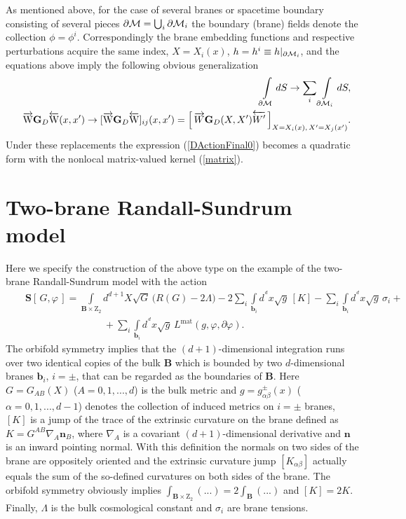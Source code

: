 \documentclass[a4paper,12pt]{article}
\newcommand{\ZA}{{A}}   %
\newcommand{\ZB}{{B}}   %
\newcommand{\ddim}{{d}}
\newcommand{\DDim}{{(d+\!1)}}
\newcommand{\M}{{\cal M}}
\newcommand{\dM}{{\partial \cal M}}
\newcommand{\dx}{{d^{^{\,\ddim}} \!x}}
\newcommand{\un}{\mathbf n} %
\newcommand{\Bnabla}{\nabla}  %
\newcommand{\GrD}{ \mathbf{G}_{D}}  %
\newcommand{\NGrDN}{\overrightarrow{\mathrm{W}}\mathbf{G}_{D}\overleftarrow{\mathrm{W}}} %
\newcommand{\RnGrDnR}{{\NGrDN}} %
\newcommand{\tens}{{\sigma}}
\newcommand{\dS}{dS}
\begin{document}
As mentioned above, for the case of several branes or spacetime
boundary consisting of several pieces $\dM=\bigcup_i\dM_i$ the
boundary (brane) fields denote the collection $\phi=\phi^i$.
Correspondingly the brane embedding functions and respective
perturbations acquire the same index, $X=X_i(x)$, $h=h^i\equiv
h|_{\dM_i}$, and the equations above imply the following obvious
generalization
    \begin{eqnarray}
     &&\int\limits_{\dM}\dS\to
     \sum\limits_i\int\limits_{\dM_i}\dS,\\
     &&{\RnGrDnR}(x,x')\to
     [{\RnGrDnR}]_{ij}(x,x')=
     \Big[\,\overrightarrow{W}\GrD(X,X')
     \overleftarrow{W'}\,\Big]
     _{X=X_i(x),\,X'=X_j(x')}.         \label{matrix}
    \end{eqnarray}
Under these replacements the expression (\ref{DActionFinal0}) becomes
a quadratic form with the nonlocal matrix-valued kernel (\ref{matrix}).


\section{Two-brane Randall-Sundrum model}
\label{Dirichlet}
\renewcommand{\M}{\mathbf B}
\renewcommand{\dM}{\mathbf b}
\hspace{\parindent}Here we specify the construction of the above
type on the example of the two-brane Randall-Sundrum model
\cite{RS} with the action
    \begin{eqnarray}
     &&\mathbf{S}[\,G,\varphi\,]=\int\limits_{\M\times\mathrm{Z}_2}
     d^{d+1}X \sqrt{G}\,
     \big(R(G)-2\Lambda\big)-
     2\sum_{i}\int\limits_{\dM_i}
     \dx\sqrt{g}\,[K] -\sum_i
     \int\limits_{\dM_i}
     \dx\sqrt{g}\, \tens_i+ \nonumber \\
     &&\qquad\qquad\qquad\qquad
     +\sum_i\int\limits_{\dM_i}\dx\sqrt{g}\,
     L^{\mathrm{mat}}
    (g,\varphi,\partial\varphi).         \label{Action}
    \end{eqnarray}
The orbifold symmetry implies that the $(d+1)$-dimensional
integration runs over two identical copies of the bulk $\M$ which
is bounded by two $\ddim$-dimensional branes $\dM_i$, $i=\pm$,
that can be regarded as the boundaries of $\M$. Here $G=G_{AB}(X)$
($A=0,1,...,d$) is the bulk metric and $g=g^\pm_{\alpha\beta}(x)$
($\alpha=0,1,...,d-1$) denotes the collection of induced metrics
on $i=\pm$ branes, $[K]$ is a jump of the trace of the extrinsic
curvature on the brane defined as $K= G^{\ZA\ZB}\nabla_\ZA
\un_\ZB$, where $\Bnabla_\ZA$ is a covariant $\DDim$-dimensional
derivative and $\un$ is an inward pointing normal. With this
definition the normals on two sides of the brane are oppositely
oriented and the extrinsic curvature jump $[K_{\alpha\beta}]$
actually equals the sum of the so-defined curvatures on both sides
of the brane. The orbifold symmetry obviously implies
$\int_{\M\times\mathrm{Z}_2}(...)=2\int_\M(...)$ and $[K]=2K$.
Finally, $\Lambda$ is the bulk cosmological constant and $\tens_i$
are brane tensions.
\end{document}
